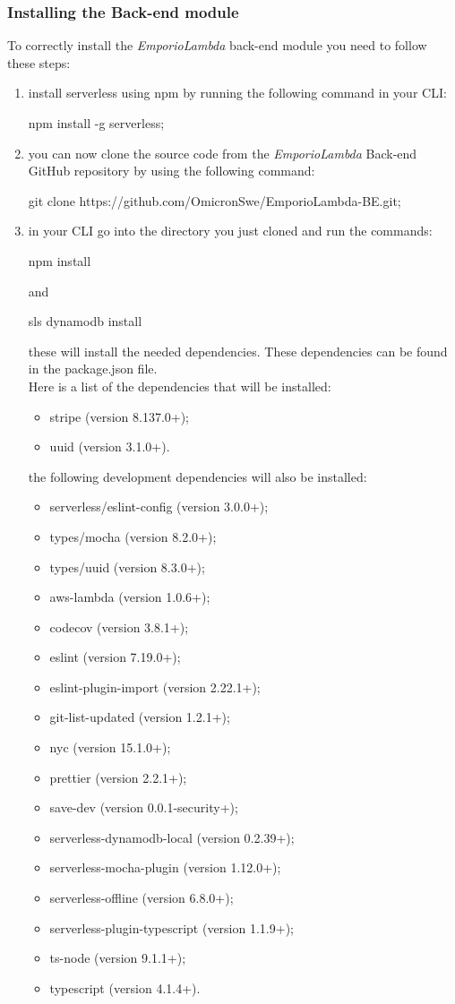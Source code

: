 \subsubsection{Installing the Back-end module}
To correctly install the \textit{EmporioLambda} back-end module you need to follow these steps:
\begin{enumerate}
\item install serverless using npm by running the following command in your CLI:\begin{center}
npm install -g serverless;
\end{center}
\item you can now clone the source code from the \textit{EmporioLambda} Back-end GitHub repository by using the following command:
\begin{center}
git clone https://github.com/OmicronSwe/EmporioLambda-BE.git;
\end{center}
\item in your CLI go into the directory you just cloned and run the commands:
\begin{center}
npm install
\end{center}
and
\begin{center}
sls dynamodb install
\end{center}
these will install the needed dependencies. These dependencies can be found in the package.json file.\\Here is a list of the dependencies that will be installed:
\begin{itemize}
\item stripe (version 8.137.0+);
\item uuid (version 3.1.0+).
\end{itemize}
the following development dependencies will also be installed:
\begin{itemize}
\item serverless/eslint-config (version 3.0.0+);
\item types/mocha (version 8.2.0+);
\item types/uuid (version 8.3.0+);
\item aws-lambda (version 1.0.6+);
\item codecov (version 3.8.1+);
\item eslint (version 7.19.0+);
\item eslint-plugin-import (version 2.22.1+);
\item git-list-updated (version 1.2.1+);
\item nyc (version 15.1.0+);
\item prettier (version 2.2.1+);
\item save-dev (version 0.0.1-security+);
\item serverless-dynamodb-local (version 0.2.39+);
\item serverless-mocha-plugin (version 1.12.0+);
\item serverless-offline (version 6.8.0+);
\item serverless-plugin-typescript (version 1.1.9+);
\item ts-node (version 9.1.1+);
\item typescript (version 4.1.4+).
\end{itemize}
\end{enumerate}